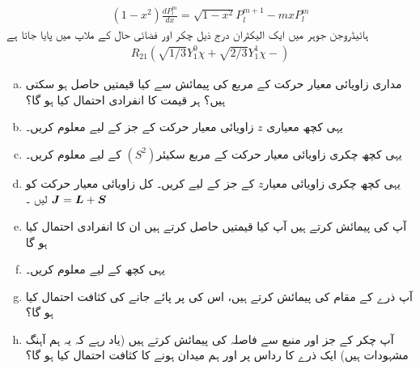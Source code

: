 \begin{align}
    (1-x^{2})\frac{ d P_{l}^{m}} {dx}=\sqrt{1-x^{2}}  P_{l}^{m+1}-mxP_{l}^{m}
\end{align}
ہائیڈروجن جوہر میں ایک الیکٹران درج ذیل چکر اور فضائی حال کے ملاپ میں پایا جاتا ہے 
\begin{align*}
    R_{21}(\sqrt{1/3}Y_{1}^{0}\chi + \sqrt{2/3}Y_{1}^{1}\chi-)
\end{align*} 
\begin{enumerate}[a.]
\item مداری زاویائی معیار حرکت کے مربع  کی پیمائش سے کیا قیمتیں حاصل ہو سکتی ہیں؟ ہر قیمت کا انفرادی احتمال کیا ہو گا؟ 
\item یہی کچھ معیاری \(z\) زاویائی معیار حرکت کے  جز کے لیے معلوم کریں۔
\item یہی کچھ چکری زاویائی معیار حرکت کے مربع سکیئر\((S^2)\) کے لیے معلوم کریں۔
\item یہی کچھ چکری زاویائی معیار\(z\) کے  جز کے لیے کریں۔ کل زاویائی معیار حرکت کو \({{\boldsymbol{J}}}={{\boldsymbol{L}}}+{{\boldsymbol{S}}}\) لیں ۔
\item آپ  کی پیمائش کرتے ہیں آپ کیا قیمتیں حاصل کرتے ہیں ان کا انفرادی احتمال کیا ہو گا
\item یہی کچھ  کے لیے معلوم کریں۔
\item  آپ ذرے کے مقام کی پیمائش کرتے ہیں، اس کی   پر پائے جانے کی کثافت احتمال کیا ہو گا؟ 
\item آپ چکر کے  جز اور منبع سے فاصلہ کی پیمائش کرتے ہیں (یاد رہے کہ یہ ہم آہنگ مشہودات ہیں) ایک ذرے کا رداس   پر اور ہم میدان ہونے کا کثافت احتمال کیا ہو گا؟ 
\end{enumerate}
